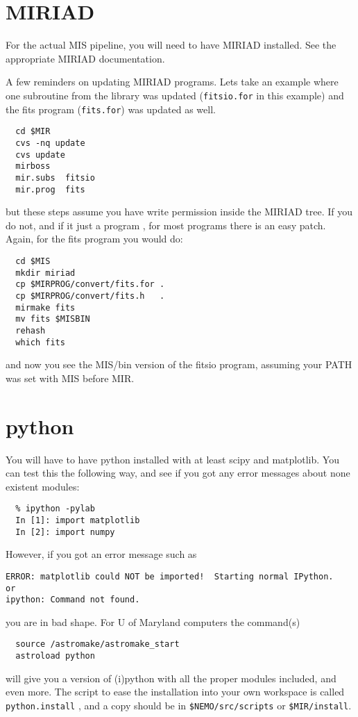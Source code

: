 \documentclass[preprint]{aastex} %
\begin{document}
\section{MIRIAD}

For the actual MIS pipeline, you will need to have MIRIAD installed.
See the appropriate MIRIAD documentation. 

A few reminders on updating MIRIAD programs. Lets take an example where
one subroutine from the library was updated ({\tt fitsio.for} in this example)
and the fits program ({\tt fits.for}) was updated as well.

\footnotesize
\begin{verbatim}
  cd $MIR
  cvs -nq update
  cvs update
  mirboss
  mir.subs  fitsio
  mir.prog  fits
\end{verbatim}
\normalsize

but these steps assume you have write permission inside the MIRIAD tree. If
you do not, and if it just a program , for most programs there is an easy
patch. Again, for the fits program you would do:

\footnotesize
\begin{verbatim}
  cd $MIS
  mkdir miriad
  cp $MIRPROG/convert/fits.for .
  cp $MIRPROG/convert/fits.h   .
  mirmake fits
  mv fits $MISBIN
  rehash
  which fits
\end{verbatim}
\normalsize

and now you see the MIS/bin version of the fitsio program, assuming your PATH was set with MIS before MIR.

\section{python}

You will have to have python installed with at least scipy and matplotlib. You can test
this the following way, and see if you got any error messages about
none existent modules:

\footnotesize
\begin{verbatim}
  % ipython -pylab
  In [1]: import matplotlib
  In [2]: import numpy
\end{verbatim}
\normalsize


However, if you got an error message such as
\footnotesize
\begin{verbatim}
ERROR: matplotlib could NOT be imported!  Starting normal IPython.
or
ipython: Command not found.
\end{verbatim}
\normalsize
you are in bad shape. For U of Maryland computers the command(s)
\footnotesize
\begin{verbatim}
  source /astromake/astromake_start
  astroload python
\end{verbatim}
\normalsize
will give you a version of (i)python with all the proper modules included,
and even more. The script to ease the installation into your own workspace is
called {\tt python.install} , and a copy should be in
{\tt \$NEMO/src/scripts} or {\tt \$MIR/install}.
\end{document}
